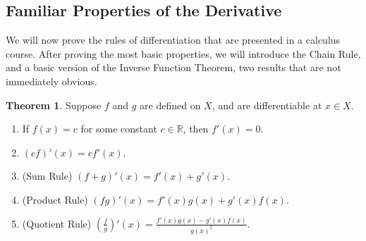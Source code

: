 \documentclass{article}
\newcommand{\R}{\mathbb{R}}
\theoremstyle{definition}
\newtheorem{theorem}{Theorem}[section]
\begin{document}
	\subsection{Familiar Properties of the Derivative}
	We will now prove the rules of differentiation that are presented in a calculus course. After proving the most basic properties, we will introduce the Chain Rule, and a basic version of the Inverse Function Theorem, two results that are not immediately obvious.  
	\begin{theorem}
		Suppose $ f $ and $ g $ are defined on $  X $, and are differentiable at $ x\in  X $.
		\begin{enumerate}
			\item If $ f(x)=c $ for some constant $ c\in\R $, then $ f'(x)=0 $.
			\item $ (cf)'(x)=cf'(x) $.
			\item (Sum Rule) $ (f+g)'(x)=f'(x)+g'(x)$.
			\item (Product Rule) $(fg)'(x)=f'(x)g(x)+g'(x)f(x) $.
			\item (Quotient Rule) $\left(\frac{f}{g}\right)'(x)=\frac{f'(x)g(x)-g'(x)f(x)}{g(x)^2} $.
		\end{enumerate}
	\end{theorem}
\end{document}
